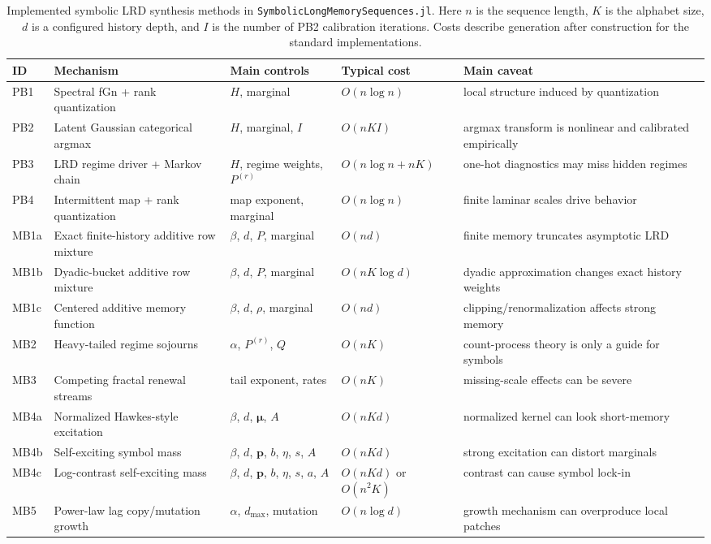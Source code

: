 \documentclass[journal]{IEEEtran}
\newcommand{\pkg}[1]{\texttt{#1}}
\newcommand{\vect}[1]{\boldsymbol{#1}}
\newcommand{\sfive}{\pkg{SymbolicLongMemorySequences.jl}}
\begin{document}
\begin{table}[!t]
\caption{Implemented symbolic LRD synthesis methods in \sfive{}. Here $n$ is the
sequence length, $K$ is the alphabet size, $d$ is a configured history depth,
and $I$ is the number of PB2 calibration iterations. Costs describe generation
after construction for the standard implementations.}
\label{tab:methods}
\centering
\footnotesize
\begin{tabular}{lp{}p{}lp{}}
\hline
ID & Mechanism & Main controls & Typical cost & Main caveat \\
\hline
PB1 & Spectral fGn + rank quantization & $H$, marginal & $O(n\log n)$ & local structure induced by quantization \\
PB2 & Latent Gaussian categorical argmax & $H$, marginal, $I$ & $O(nKI)$ & argmax transform is nonlinear and calibrated empirically \\
PB3 & LRD regime driver + Markov chain & $H$, regime weights, $P^{(r)}$ & $O(n\log n+nK)$ & one-hot diagnostics may miss hidden regimes \\
PB4 & Intermittent map + rank quantization & map exponent, marginal & $O(n\log n)$ & finite laminar scales drive behavior \\
\hline
MB1a & Exact finite-history additive row mixture & $\beta$, $d$, $P$, marginal & $O(nd)$ & finite memory truncates asymptotic LRD \\
MB1b & Dyadic-bucket additive row mixture & $\beta$, $d$, $P$, marginal & $O(nK\log d)$ & dyadic approximation changes exact history weights \\
MB1c & Centered additive memory function & $\beta$, $d$, $\rho$, marginal & $O(nd)$ & clipping/renormalization affects strong memory \\
MB2 & Heavy-tailed regime sojourns & $\alpha$, $P^{(r)}$, $Q$ & $O(nK)$ & count-process theory is only a guide for symbols \\
MB3 & Competing fractal renewal streams & tail exponent, rates & $O(nK)$ & missing-scale effects can be severe \\
MB4a & Normalized Hawkes-style excitation & $\beta$, $d$, $\vect{\mu}$, $A$ & $O(nKd)$ & normalized kernel can look short-memory \\
MB4b & Self-exciting symbol mass & $\beta$, $d$, $\vect{p}$, $b$, $\eta$, $s$, $A$ & $O(nKd)$ & strong excitation can distort marginals \\
MB4c & Log-contrast self-exciting mass & $\beta$, $d$, $\vect{p}$, $b$, $\eta$, $s$, $a$, $A$ & $O(nKd)$ or $O(n^2K)$ & contrast can cause symbol lock-in \\
MB5 & Power-law lag copy/mutation growth & $\alpha$, $d_{\max}$, mutation & $O(n\log d)$ & growth mechanism can overproduce local patches \\
\hline
\end{tabular}
\end{table}
\end{document}
